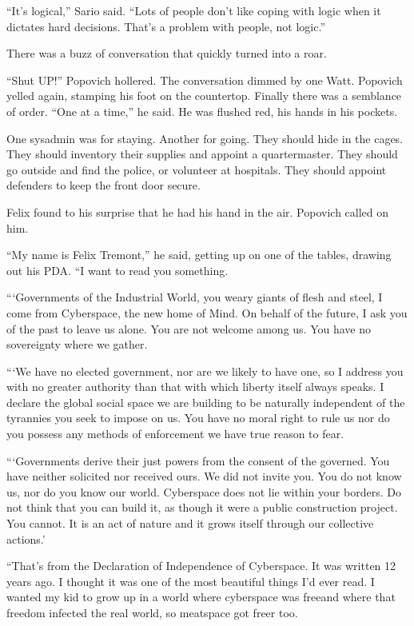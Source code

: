 “It’s logical,” Sario said. “Lots of people don’t like coping with
logic when it dictates hard decisions. That’s a problem with
people, not logic.”

There was a buzz of conversation that quickly turned into a roar.

“Shut UP!” Popovich hollered. The conversation dimmed by one Watt.
Popovich yelled again, stamping his foot on the countertop. Finally
there was a semblance of order. “One at a time,” he said. He was
flushed red, his hands in his pockets.

One sysadmin was for staying. Another for going. They should hide
in the cages. They should inventory their supplies and appoint a
quartermaster. They should go outside and find the police, or
volunteer at hospitals. They should appoint defenders to keep the
front door secure.

Felix found to his surprise that he had his hand in the air.
Popovich called on him.

“My name is Felix Tremont,” he said, getting up on one of the
tables, drawing out his PDA. “I want to read you something.

“‘Governments of the Industrial World, you weary giants of flesh
and steel, I come from Cyberspace, the new home of Mind. On behalf
of the future, I ask you of the past to leave us alone. You are not
welcome among us. You have no sovereignty where we gather.

“‘We have no elected government, nor are we likely to have one, so
I address you with no greater authority than that with which
liberty itself always speaks. I declare the global social space we
are building to be naturally independent of the tyrannies you seek
to impose on us. You have no moral right to rule us nor do you
possess any methods of enforcement we have true reason to fear.

“‘Governments derive their just powers from the consent of the
governed. You have neither solicited nor received ours. We did not
invite you. You do not know us, nor do you know our world.
Cyberspace does not lie within your borders. Do not think that you
can build it, as though it were a public construction project. You
cannot. It is an act of nature and it grows itself through our
collective actions.’

“That’s from the Declaration of Independence of Cyberspace. It was
written 12 years ago. I thought it was one of the most beautiful
things I’d ever read. I wanted my kid to grow up in a world where
cyberspace was free\dash{}and where that freedom infected the real world,
so meatspace got freer too.

